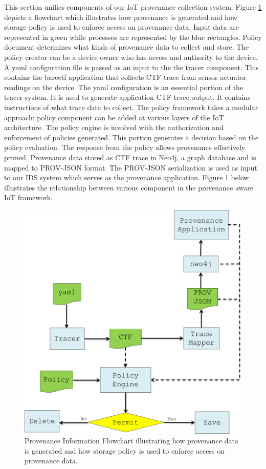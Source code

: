 This section unifies components of our IoT provenance collection system. Figure \ref{flow_chart} depicts a flowchart which illustrates how provenance is generated and how storage policy is used to enforce access on provenance data. Input data are represented in green while processes are represented by the blue rectangles. Policy document determines what kinds of provenance data to collect and store. The policy creator can be a device owner who has access and authority to the device. A yaml configuration file is passed as an input to the the tracer component. This contains the barectf application that collects CTF trace from sensor-actuator readings on the device. The yaml configuration is an essential portion of the tracer system. It is used to generate application CTF trace output. It contains instructions of what trace data to collect. The policy framework takes a modular approach: policy component can be added at various layers of the IoT architecture. The policy engine is involved with the authorization and enforcement of policies generated. This portion generates a decision based on the policy evaluation. The response from the policy allows provenance effectively pruned. Provenance data stored as CTF trace in Neo4j, a graph database and is mapped to PROV-JSON format. The PROV-JSON serialization is used as input to our IDS system which serves as the provenance application. Figure \ref{flow_chart} below illustrates the relationship between various component in the provenance aware IoT framework.

\begin{figure}[h!]
\begin{center}

\includegraphics[width =4.5in]{policy_flowchart.PNG}    
\end{center}
\caption{Provenance Information Flowchart illustrating how provenance data is generated and how storage policy is used to enforce access on provenance data. }
\label{flow_chart}
\end{figure}

